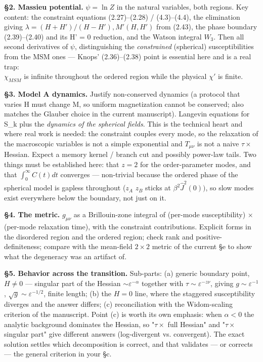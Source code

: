 \documentclass[11pt,a4paper]{article}
\begin{document}
\textbf{§2. Massieu potential.} $\psi = \ln Z$ in the natural variables, both regions. Key content: the constraint equations (2.27)–(2.28) / (4.3)–(4.4), the elimination giving $\lambda  = (H + H')/(H - H'), M'(H, H')$ from (2.43), the phase boundary (2.39)--(2.40) and its H' = 0 reduction, and the Watson integral $W_3$. Then all second derivatives of $\psi$, distinguishing the \textit{constrained} (spherical) susceptibilities from the MSM ones — Knops' (2.36)--(2.38) point is essential here and is a real trap: \\$\chi_{MSM}$ is infinite throughout the ordered region while the physical $\chi '$ is finite.

\textbf{§3. Model A dynamics.} Justify non-conserved dynamics (a protocol that varies H must change M, so uniform magnetization cannot be conserved; also matches the Glauber choice in the current manuscript). Langevin equations for S\_k plus the \textit{dynamics of the spherical fields}. This is the technical heart and where real work is needed: the constraint couples every mode, so the relaxation of the macroscopic variables is not a simple exponential and $T_{\mu\nu}$ is not a naive $\tau \times$ Hessian. Expect a memory kernel / branch cut and possibly power-law tails. Two things must be established here: that $z = 2$ for the order-parameter modes, and that $\int_0^{\infty} C(t) dt$ converges — non-trivial because the ordered phase of the spherical model is gapless throughout ($z_A$  $z_B$ sticks at $\beta^2\hat{J}^2(0))$, so slow modes exist everywhere below the boundary, not just on it.

\textbf{§4. The metric.} $g_{\mu\nu}$ as a Brillouin-zone integral of (per-mode susceptibility) × (per-mode relaxation time), with the constraint contributions. Explicit forms in the disordered region and the ordered region; check rank and positive-definiteness; compare with the mean-field $2\times 2$ metric of the current §e to show what the degeneracy was an artifact of.

\textbf{§5. Behavior across the transition.} Sub-parts: (a) generic boundary point, $H \neq 0$ --- singular part of the Hessian $\sim \varepsilon^{-\alpha} $ together with $\tau  \sim \varepsilon^{-z\nu}$, giving $g \sim ε^{-1}$, $\sqrt{g} \sim \varepsilon^{-1/2}$, finite length; (b) the $H = 0$ line, where the staggered susceptibility diverges and the answer differs; (c) reconciliation with the Widom-scaling criterion of the manuscript. Point (c) is worth its own emphasis: when $\alpha < 0$ the analytic background dominates the Hessian, so "$\tau\times$ full Hessian" and "$\tau\times$ singular part" give different answers (log-divergent vs. convergent). The exact solution settles which decomposition is correct, and that validates --- or corrects --- the general criterion in your §c.
\end{document}
